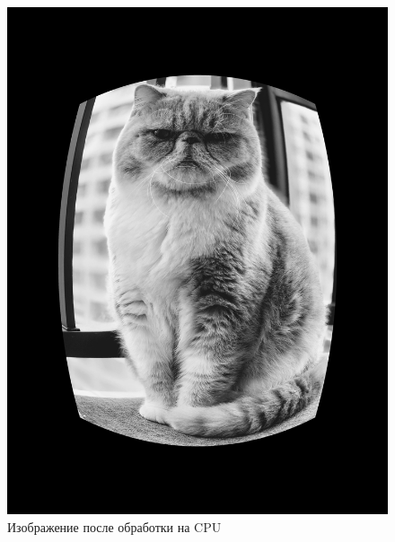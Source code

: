 \begin{figure}[H]
    \centering
    \includegraphics[width=\textwidth]{figures/CPUCat.jpg}
    \caption{Изображение после обработки на CPU}
    \label{fig:cpucat}
\end{figure}

